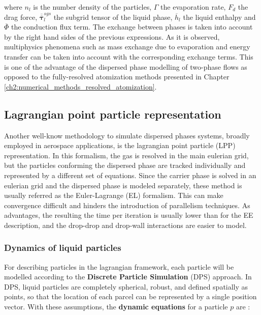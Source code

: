 where $n_l$ is the number density of the particles, $\Gamma$ the evaporation rate, $F_{d}$ the drag force, $\overline{\overline{\pmb{\tau}}}_l^{sgs}$ the subgrid tensor of the liquid phase, $\overline{h}_l$ the liquid enthalpy and $\overline{\Phi}$ the conduction flux term. The exchange between phases is taken into account by the right hand sides of the previous expressions. As it is observed, multiphysics phenomena such as mass exchange due to evaporation and energy transfer can be taken into account with the corresponding exchange terms.  This is one of the advantage of the dispersed phase modelling of two-phase flows as opposed to the fully-resolved atomization methods presented in Chapter \ref{ch2:numerical_methods_resolved_atomization}. 

\subsection{Lagrangian point particle representation}
\label{sec:ch3_EL_formalisms}

Another well-know methodology to simulate dispersed phases systems, broadly employed in aerospace applications, is the lagrangian point particle (LPP) representation. In this formalism, the gas is resolved in the main eulerian grid, but the particles conforming the dispersed phase are tracked individually and represented by a different set of equations. Since the carrier phase is solved in an eulerian grid and the dispersed phase is modeled separately, these method is usually referred as the Euler-Lagrange (EL) formalism. This can make convergence difficult and hinders the introduction of parallelism techniques. As advantages, the resulting the time per iteration is usually lower than for the EE description, and the drop-drop and drop-wall interactions are easier to model.

\subsubsection*{Dynamics of liquid particles}

For describing particles in the lagrangian framework, each particle will be modelled according to the \textbf{Discrete Particle Simulation} (DPS) approach. In DPS, liquid particles are completely spherical, robust, and defined spatially as points, so that the location of each parcel can be represented by a single position vector. With these assumptions, the \textbf{dynamic equations} for a particle $p$ are :

